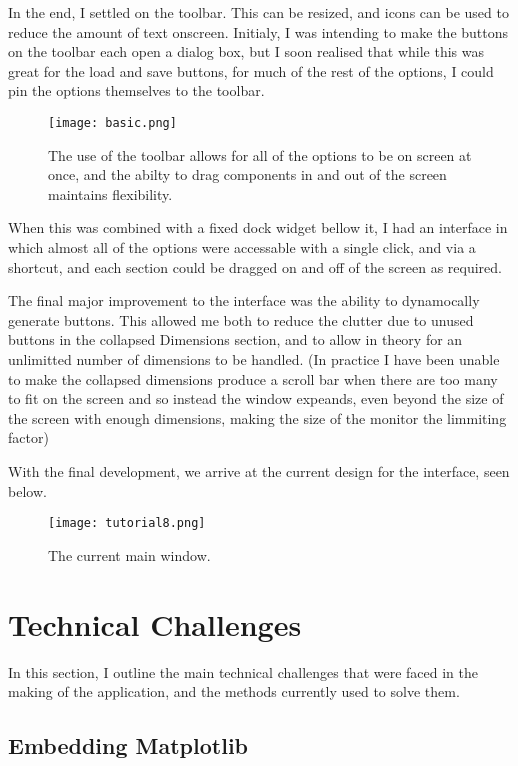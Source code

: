 \documentclass[whitecover]{MO_report}
\begin{document}
In the end, I settled on the toolbar. This can be resized, and icons can be
used to reduce the amount of text onscreen. Initialy, I was intending to
make the buttons on the toolbar each open a dialog box, but I soon realised
that while this was great for the load and save buttons, for much of the rest
of the options, I could pin the options themselves to the toolbar.

\begin{figure}[ht!]
\centering
\texttt{[image: basic.png]}
\caption{The use of the toolbar allows for all of the options to be on screen
at once, and the abilty to drag components in and out of the screen maintains
flexibility.}
\label{overflow}
\end{figure}

When this was combined with a fixed dock widget bellow it, I had an interface
in which almost all of the options were accessable with a single click, and
via a shortcut, and each section could be dragged on and off of the screen as
required.

The final major improvement to the interface was the ability to dynamocally
generate buttons. This allowed me both to reduce the clutter due to unused
buttons in the collapsed Dimensions section, and to allow in theory for an
unlimitted number of dimensions to be handled. (In practice I have been unable
to make the collapsed dimensions produce a scroll bar when there are too many
to fit on the screen and so instead the window expeands, even beyond the size
of the screen with enough dimensions, making the size of the monitor the
limmiting factor)

With the final development, we arrive at the current design for the interface,
seen below.

\begin{figure}[ht!]
\centering
\texttt{[image: tutorial8.png]}
\caption{The current main window.}
\label{overflow}
\end{figure}

\pagebreak

\chapter{Technical Challenges}

In this section, I outline the main technical challenges that were faced in the
making of the application, and the methods currently used to solve them.

\section{Embedding Matplotlib}
\end{document}
